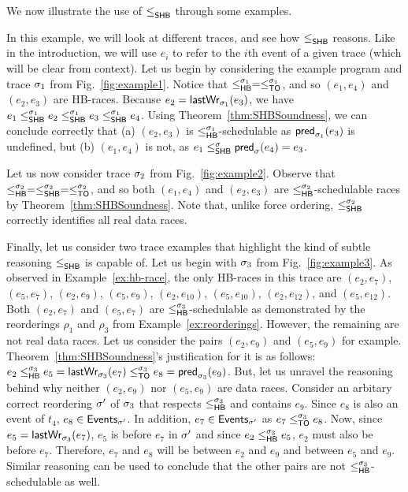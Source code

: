 

We now illustrate the use of $\leq^{}_{\mathsf{SHB}}$ through some examples.
%
\begin{example}
In this example, we will look at different traces, and see how
$\leq^{}_{\mathsf{SHB}}$ reasons. Like in the introduction, we will use $e_i$ to refer
to the $i$th event of a given trace (which will be clear from
context). Let us begin by considering the example program and trace
$\sigma_1$ from Fig.~\ref{fig:example1}. Notice that $\leq^{\sigma_1}_{\mathsf{HB}}
= \leq^{\sigma_1}_{\mathsf{TO}}$, and so $(e_1,e_4)$ and $(e_2,e_3)$ are
HB-races. Because $e_2 = \mathsf{lastWr}_{\sigma_1}(e_3)$, we have $e_1 \leq^{\sigma_1}_{\mathsf{SHB}}
e_2 \leq^{\sigma_1}_{\mathsf{SHB}} e_3 \leq^{\sigma_1}_{\mathsf{SHB}} e_4$. Using
Theorem~\ref{thm:SHBSoundness}, we can conclude correctly that (a)
$(e_2,e_3)$ is $\leq^{\sigma_1}_{\mathsf{HB}}$-schedulable as $\mathsf{pred}_{\sigma_1}(e_3)$ is
undefined, but (b) $(e_1,e_4)$ is not, as
$e_1 \leq^{\sigma}_{\mathsf{SHB}} \mathsf{pred}_{\sigma}(e_4) = e_3$.

Let us now consider trace $\sigma_2$ from
Fig.~\ref{fig:example2}. Observe that $\leq^{\sigma_2}_{\mathsf{HB}} = \leq^{\sigma_2}_{\mathsf{SHB}}
= \leq^{\sigma_2}_{\mathsf{TO}}$, and so both $(e_1,e_4)$ and $(e_2,e_3)$ are
$\leq^{\sigma_2}_{\mathsf{HB}}$-schedulable races by Theorem~\ref{thm:SHBSoundness}. Note
that, unlike force ordering, $\leq^{\sigma_2}_{\mathsf{SHB}}$ correctly identifies all
real data races.

Finally, let us consider two trace examples that highlight the kind of
subtle reasoning $\leq^{}_{\mathsf{SHB}}$ is capable of. Let us begin with $\sigma_3$
from Fig.~\ref{fig:example3}. As observed in Example~\ref{ex:hb-race},
the only HB-races in this trace are $(e_2,e_7)$, $(e_5,e_7)$,
$(e_2,e_9)$, $(e_5,e_9)$, $(e_2,e_{10})$, $(e_5,e_{10})$,
$(e_2,e_{12})$, and $(e_5,e_{12})$. Both $(e_2,e_7)$ and $(e_5,e_7)$
are $\leq^{\sigma_3}_{\mathsf{HB}}$-schedulable as demonstrated by the reorderings
$\rho_1$ and $\rho_3$ from Example~\ref{ex:reorderings}. However, the
remaining are not real data races. Let us consider the pairs
$(e_2,e_9)$ and $(e_5,e_9)$ for
example. Theorem~\ref{thm:SHBSoundness}'s justification for it is as
follows: $e_2 \leq^{\sigma_3}_{\mathsf{HB}} e_5 = \mathsf{lastWr}_{\sigma_3}(e_7) \leq^{\sigma_3}_{\mathsf{TO}} e_8
= \mathsf{pred}_{\sigma_3}(e_9)$. But, let us unravel the reasoning behind why
neither $(e_2,e_9)$ nor $(e_5,e_9)$ are data races. Consider an
arbitary correct reordering $\sigma'$ of $\sigma_3$ that respects
$\leq^{\sigma_3}_{\mathsf{HB}}$ and contains $e_9$. Since $e_8$ is also an event of
$t_4$, $e_8 \in \mathsf{Events}_{\sigma'}$. In addition, $e_7 \in \mathsf{Events}_{\sigma'}$
as $e_7 \leq^{\sigma_3}_{\mathsf{TO}} e_8$. Now, since $e_5 = \mathsf{lastWr}_{\sigma_3}(e_7)$, $e_5$ is
before $e_7$ in $\sigma'$ and since $e_2 \leq^{\sigma_3}_{\mathsf{HB}} e_5$, $e_2$ must also
be before $e_7$. Therefore, $e_7$ and $e_8$ will be between $e_2$ and
$e_9$ and between $e_5$ and $e_9$. Similar reasoning can be used to
conclude that the other pairs are not $\leq^{\sigma_3}_{\mathsf{HB}}$-schedulable as
well. 


\end{example}
